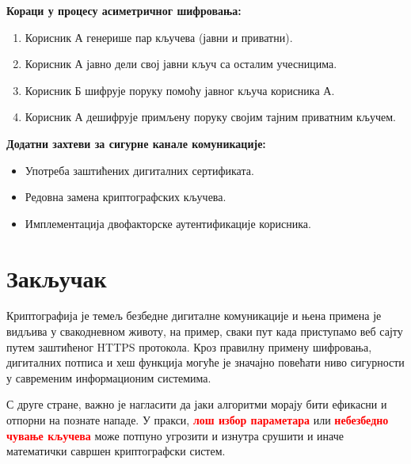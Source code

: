 \documentclass[12pt]{article}
\theoremstyle{definition}
\begin{document}
\vspace{1.5em} 

\noindent
\textbf{Кораци у процесу асиметричног шифровања:}
\begin{enumerate}
    \item Корисник А генерише пар кључева (јавни и приватни).
    \item Корисник А јавно дели свој јавни кључ са осталим учесницима.
    \item Корисник Б шифрује поруку помоћу јавног кључа корисника А.
    \item Корисник А дешифрује примљену поруку својим тајним приватним кључем.
\end{enumerate}

\vspace{1em}
\textbf{Додатни захтеви за сигурне канале комуникације:}
\begin{itemize}
    \item Употреба заштићених дигиталних сертификата.
    \item Редовна замена криптографских кључева.
    \item Имплементација двофакторске аутентификације корисника.
\end{itemize}

\section{Закључак}

Криптографија је темељ безбедне дигиталне комуникације и њена примена је видљива у свакодневном животу, на пример, сваки пут када приступамо веб сајту путем заштићеног HTTPS протокола. Кроз правилну примену шифровања, дигиталних потписа и хеш функција могуће је значајно повећати ниво сигурности у савременим информационим системима. 

С друге стране, важно је нагласити да јаки алгоритми морају бити ефикасни и отпорни на познате нападе. У пракси,  \textcolor{red}{\textbf{лош избор параметара}} или \textcolor{red}{\textbf{небезбедно чување кључева}} може потпуно угрозити и изнутра срушити и иначе математички савршен криптографски систем.
\end{document}
